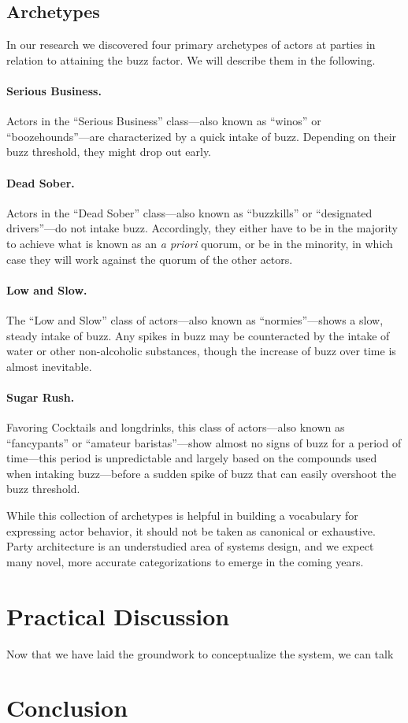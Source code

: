 \documentclass[twocolumn]{article}
\begin{document}
\subsection{Archetypes}

In our research we discovered four primary archetypes of actors at parties in
relation to attaining the buzz factor. We will describe them in the following.

\paragraph{Serious Business.} Actors in the “Serious Business” class—also known
as “winos” or “boozehounds”—are characterized by a quick intake of buzz.
Depending on their buzz threshold, they might drop out early.

\paragraph{Dead Sober.} Actors in the “Dead Sober” class—also known as
“buzzkills” or “designated drivers”—do not intake buzz. Accordingly, they either
have to be in the majority to achieve what is known as an \textit{a priori}
quorum, or be in the minority, in which case they will work against the quorum
of the other actors.

\paragraph{Low and Slow.} The “Low and Slow” class of actors—also known as
“normies”—shows a slow, steady intake of buzz. Any spikes in buzz may be
counteracted by the intake of water or other non-alcoholic substances, though
the increase of buzz over time is almost inevitable.

\paragraph{Sugar Rush.} Favoring Cocktails and longdrinks, this class of
actors—also known as “fancypants” or “amateur baristas”—show almost no signs of
buzz for a period of time—this period is unpredictable and largely based on the
compounds used when intaking buzz—before a sudden spike of buzz that can easily
overshoot the buzz threshold.

\bigskip

While this collection of archetypes is helpful in building a vocabulary for
expressing actor behavior, it should not be taken as canonical or exhaustive.
Party architecture is an understudied area of systems design, and we expect many
novel, more accurate categorizations to emerge in the coming years.

\section{Practical Discussion}

Now that we have laid the groundwork to conceptualize the system, we can talk


\section{Conclusion}
\end{document}

